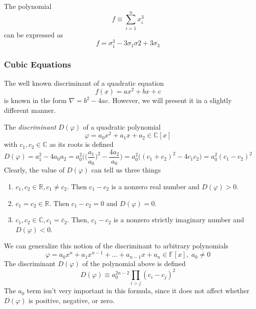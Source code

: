 \documentclass{article}
\begin{document}
      \begin{example}
        The polynomial 
        \[f \equiv \sum_{i=1}^n x_i^3\]
        can be expressed as 
        \[f = \sigma_1^3 - 3 \sigma_1 \sigma 2 + 3 \sigma_3\]
      \end{example}

    \subsubsection{Cubic Equations}

      The well known discriminant of a quadratic equation 
      \[f(x) = ax^2 + bx + c\]
      is known in the form $\nabla = b^2 - 4ac$. However, we will present it in a slightly different manner. 

      \begin{definition}
        The \textit{discriminant} $D(\varphi)$ of a quadratic polynomial
        \[\varphi = a_0 x^2 + a_1 x + a_2 \in \mathbb{C}[x]\]
        with $c_1, c_2 \in \mathbb{C}$ as its roots is defined
        \[D(\varphi) = a_1^2 - 4 a_0 a_2 = a_0^2 \bigg( \Big(\frac{a_1}{a_0} \Big)^2 - \frac{4 a_2}{a_0} \bigg) = a_0^2 \big( (c_1 + c_2)^2 - 4 c_1 c_2 \big) = a_0^2 (c_1 - c_2)^2\]
        Clearly, the value of $D(\varphi)$ can tell us three things
        \begin{enumerate}
          \item $c_1, c_2 \in \mathbb{R}, c_1 \neq c_2$. Then $c_1 - c_2$ is a nonzero real number and $D(\varphi) > 0$. 
          \item $c_1 = c_2 \in \mathbb{R}$. Then $c_1 - c_2 = 0$ and $D(\varphi) = 0$. 
          \item $c_1, c_2 \in \mathbb{C}, c_1 = \bar{c}_2$. Then, $c_1 - c_2$ is a nonzero strictly imaginary number and $D(\varphi) < 0$. 
        \end{enumerate}
      \end{definition}

      \begin{definition}
        We can generalize this notion of the discriminant to arbitrary polynomials
        \[\varphi = a_0 x^n + a_1 x^{n-1} + ... + a_{n-1} x + a_n \in \mathbb{F}[x], \; a_0 \neq 0\]
        The discriminant $D(\varphi)$ of the polynomial above is defined
        \[D(\varphi) \equiv a_0^{2n-2} \prod_{i>j} (c_i - c_j)^2\]
        The $a_0$ term isn't very important in this formula, since it does not affect whether $D(\varphi)$ is positive, negative, or zero. 
      \end{definition}
\end{document}
